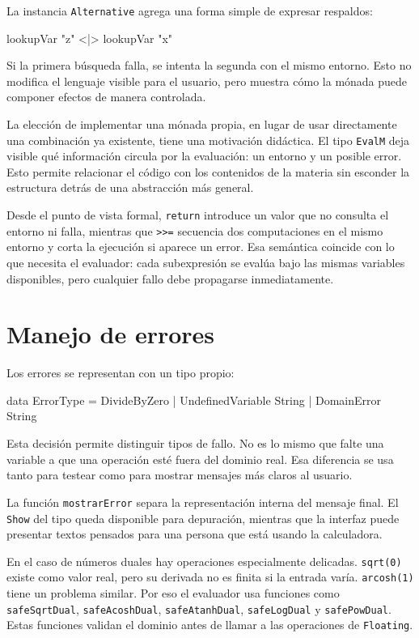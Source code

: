 \documentclass[11pt,a4paper]{article}
\newenvironment{lstlisting}{\verbatim}{\endverbatim}
\begin{document}
La instancia \texttt{Alternative} agrega una forma simple de expresar respaldos:

\begin{lstlisting}
lookupVar "z" <|> lookupVar "x"
\end{lstlisting}

Si la primera búsqueda falla, se intenta la segunda con el mismo entorno. Esto no modifica el lenguaje visible para el usuario, pero muestra cómo la mónada puede componer efectos de manera controlada.

La elección de implementar una mónada propia, en lugar de usar directamente una combinación ya existente, tiene una motivación didáctica. El tipo \texttt{EvalM} deja visible qué información circula por la evaluación: un entorno y un posible error. Esto permite relacionar el código con los contenidos de la materia sin esconder la estructura detrás de una abstracción más general.

Desde el punto de vista formal, \texttt{return} introduce un valor que no consulta el entorno ni falla, mientras que \texttt{>>=} secuencia dos computaciones en el mismo entorno y corta la ejecución si aparece un error. Esa semántica coincide con lo que necesita el evaluador: cada subexpresión se evalúa bajo las mismas variables disponibles, pero cualquier fallo debe propagarse inmediatamente.

\section{Manejo de errores}

Los errores se representan con un tipo propio:

\begin{lstlisting}
data ErrorType
  = DivideByZero
  | UndefinedVariable String
  | DomainError String
\end{lstlisting}

Esta decisión permite distinguir tipos de fallo. No es lo mismo que falte una variable a que una operación esté fuera del dominio real. Esa diferencia se usa tanto para testear como para mostrar mensajes más claros al usuario.

La función \texttt{mostrarError} separa la representación interna del mensaje final. El \texttt{Show} del tipo queda disponible para depuración, mientras que la interfaz puede presentar textos pensados para una persona que está usando la calculadora.

En el caso de números duales hay operaciones especialmente delicadas. \texttt{sqrt(0)} existe como valor real, pero su derivada no es finita si la entrada varía. \texttt{arcosh(1)} tiene un problema similar. Por eso el evaluador usa funciones como \texttt{safeSqrtDual}, \texttt{safeAcoshDual}, \texttt{safeAtanhDual}, \texttt{safeLogDual} y \texttt{safePowDual}. Estas funciones validan el dominio antes de llamar a las operaciones de \texttt{Floating}.
\end{document}
